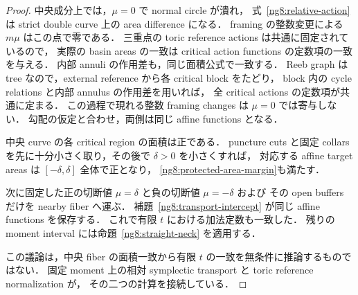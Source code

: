 \begin{proof}
中央成分上では，$\mu=0$ で normal circle が潰れ，
式~\eqref{ng8:relative-action} は strict double curve 上の area difference になる．
framing の整数変更による $m\mu$ はこの点で零である．
三重点の toric reference actions は共通に固定されているので，
実際の basin areas の一致は critical action functions の定数項の一致を与える．
内部 annuli の作用差も，同じ面積公式で一致する．
Reeb graph は tree なので，external reference から各 critical block をたどり，
block 内の cycle relations と内部 annulus の作用差を用いれば，
全 critical actions の定数項が共通に定まる．
この過程で現れる整数 framing changes は $\mu=0$ では寄与しない．
勾配の仮定と合わせ，両側は同じ affine functions となる．

中央 curve の各 critical region の面積は正である．
puncture cuts と固定 collars を先に十分小さく取り，その後で $\delta>0$ を小さくすれば，
対応する affine target areas は $[-\delta,\delta]$ 全体で正となり，
\eqref{ng8:protected-area-margin}も満たす．

次に固定した正の切断値 $\mu=\delta$ と負の切断値 $\mu=-\delta$ および
その open buffers だけを nearby fiber へ運ぶ．
補題~\ref{ng8:transport-intercept} が同じ affine functions を保存する．
これで有限 $t$ における加法定数も一致した．
残りの moment interval には命題~\ref{ng8:straight-neck} を適用する．

この議論は，中央 fiber の面積一致から有限 $t$ の一致を無条件に推論するものではない．
固定 moment 上の相対 symplectic transport と toric reference normalization が，
その二つの計算を接続している．
\end{proof}
